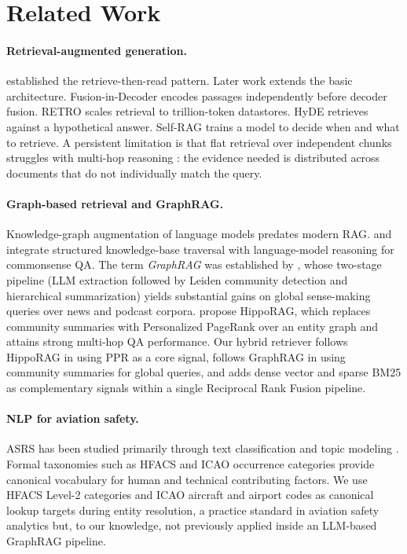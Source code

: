 \documentclass[10pt,a4paper]{article}
\begin{document}
\section{Related Work}
\label{sec:related}

\paragraph{Retrieval-augmented generation.}
\citet{lewis2020rag} established the retrieve-then-read pattern.
Later work extends the basic architecture. Fusion-in-Decoder
\citep{izacard2021fid} encodes passages independently before decoder
fusion. RETRO \citep{borgeaud2022retro} scales retrieval to
trillion-token datastores. HyDE \citep{gao2023hyde} retrieves against
a hypothetical answer. Self-RAG \citep{asai2024selfrag} trains a model
to decide when and what to retrieve. A persistent limitation is that
flat retrieval over independent chunks struggles with multi-hop
reasoning \citep{trivedi2023ircot}: the evidence needed is distributed
across documents that do not individually match the query.

\paragraph{Graph-based retrieval and GraphRAG.}
Knowledge-graph augmentation of language models predates modern RAG.
\citet{sun2018graftnet} and \citet{yasunaga2021qagnn} integrate
structured knowledge-base traversal with language-model reasoning for
commonsense QA. The term \emph{GraphRAG} was established by
\citet{edge2024graphrag}, whose two-stage pipeline (LLM extraction
followed by Leiden community detection \citep{traag2019leiden} and
hierarchical summarization) yields substantial gains on global
sense-making queries over news and podcast corpora.
\citet{gutierrez2024hipporag} propose HippoRAG, which replaces
community summaries with Personalized PageRank over an entity graph
and attains strong multi-hop QA performance. Our hybrid retriever
follows HippoRAG in using PPR as a core signal, follows GraphRAG in
using community summaries for global queries, and adds dense vector
and sparse BM25 as complementary signals within a single Reciprocal
Rank Fusion \citep{cormack2009rrf} pipeline.

\paragraph{NLP for aviation safety.}
ASRS has been studied primarily through text classification and topic
modeling \citep{kuhn2018asrs,rose2015asrs}. Formal taxonomies such as
HFACS \citep{shappell2001hfacs} and ICAO occurrence categories
\citep{icao2016doc9859} provide canonical vocabulary for human and
technical contributing factors. We use HFACS Level-2 categories and
ICAO aircraft and airport codes as canonical lookup targets during
entity resolution, a practice standard in aviation safety analytics
but, to our knowledge, not previously applied inside an LLM-based
GraphRAG pipeline.
\end{document}
